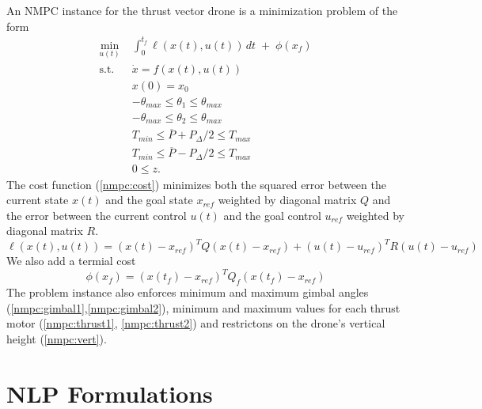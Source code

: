 \documentclass[]{article}
\newcommand{\nmpc}{NMPC}
\newcommand{\pdiff}{P_{\Delta}}
\newcommand{\pavg}{\overline{P}}
\begin{document}
 	An {\nmpc} instance for the thrust vector drone is a minimization problem of the form
	\begin{align}
	   \min_{u(t)} \; &  \int_{0}^{t_f} \ell(x(t),u(t))\,dt  \;+\; \phi(x_f) \label{nmpc:cost} \\
	   \text{s.t.} \;\; 	&  \dot{x} =  f(x(t),u(t))  \nonumber \\ 
	   				& x(0) = x_0 \nonumber \\
	   				&	-\theta_{max} \leq \theta_1 \leq \theta_{max} \label{nmpc:gimbal1} \\
	   				& 	-\theta_{max} \leq \theta_2 \leq \theta_{max} \label{nmpc:gimbal2} \\
	   				& 	T_{min}  \leq \pavg + \pdiff/2 \leq T_{max} \label{nmpc:thrust1} \\
	   				&    T_{min} \leq  \pavg - \pdiff/2 \leq T_{max} \label{nmpc:thrust2} \\
	   				&        0 \leq z. \label{nmpc:vert}
	\end{align}
	The cost function (\ref{nmpc:cost}) minimizes both  the squared error between the current state $x(t)$ and the goal state $x_{ref}$ weighted by diagonal matrix $Q$ and the error between the current control $u(t)$ and the goal control $u_{ref}$ weighted by diagonal matrix $R$. 
	\begin{equation*}
		\ell(x(t),u(t))= (x(t)-x_{ref})^T Q (x(t)-x_{ref}) + (u(t)-u_{ref})^T R (u(t)-u_{ref}) 
	\end{equation*}
	We also add a termial cost 
	\begin{equation*}
		\phi(x_f) = (x(t_f)-x_{ref})^T Q_f (x(t_f)-x_{ref})
	\end{equation*}
	The problem instance also enforces minimum and maximum gimbal angles (\ref{nmpc:gimbal1},\ref{nmpc:gimbal2}), minimum and maximum values for each thrust motor (\ref{nmpc:thrust1}, \ref{nmpc:thrust2}) and restrictons on the drone's vertical height (\ref{nmpc:vert}).




\section*{NLP Formulations}
\end{document}
